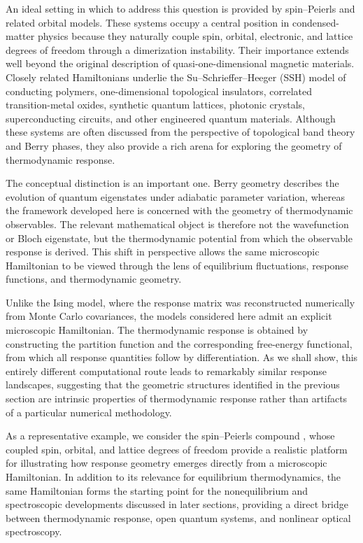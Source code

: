 An ideal setting in which to address this question is provided
by spin–Peierls and related orbital models. These systems
occupy a central position in condensed-matter physics because
they naturally couple spin, orbital, electronic, and lattice
degrees of freedom through a dimerization instability. Their
importance extends well beyond the original description of
quasi-one-dimensional magnetic materials. Closely related
Hamiltonians underlie the Su–Schrieffer–Heeger (SSH) model of
conducting polymers, one-dimensional topological insulators,
correlated transition-metal oxides, synthetic quantum lattices,
photonic crystals, superconducting circuits, and other
engineered quantum materials. Although these systems are often
discussed from the perspective of topological band theory and
Berry phases, they also provide a rich arena for exploring the
geometry of thermodynamic response.

The conceptual distinction is an important one. Berry geometry
describes the evolution of quantum eigenstates under adiabatic
parameter variation, whereas the framework developed here is
concerned with the geometry of thermodynamic observables. The
relevant mathematical object is therefore not the wavefunction
or Bloch eigenstate, but the thermodynamic potential from which
the observable response is derived. This shift in perspective
allows the same microscopic Hamiltonian to be viewed through the
lens of equilibrium fluctuations, response functions, and
thermodynamic geometry.

Unlike the Ising model, where the response matrix was
reconstructed numerically from Monte Carlo covariances, the
models considered here admit an explicit microscopic
Hamiltonian. The thermodynamic response is obtained by
constructing the partition function and the corresponding
free-energy functional, from which all response quantities
follow by differentiation. As we shall show, this entirely
different computational route leads to remarkably similar
response landscapes, suggesting that the geometric structures
identified in the previous section are intrinsic properties of
thermodynamic response rather than artifacts of a particular
numerical methodology.

As a representative example, we consider the spin–Peierls
compound , whose coupled spin, orbital, and lattice
degrees of freedom provide a realistic platform for illustrating
how response geometry emerges directly from a microscopic
Hamiltonian. In addition to its relevance for equilibrium
thermodynamics, the same Hamiltonian forms the starting point
for the nonequilibrium and spectroscopic developments discussed
in later sections, providing a direct bridge between
thermodynamic response, open quantum systems, and nonlinear
optical spectroscopy.


